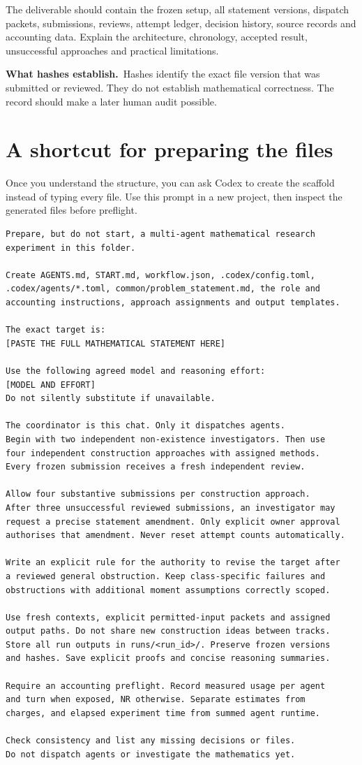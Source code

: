 \documentclass[11pt,a4paper]{article}
\newcommand{\note}[2]{\par\smallskip\noindent\colorbox{paperblue}{\parbox{\dimexpr\linewidth-2\fboxsep\relax}{\textbf{#1}\ #2}}\par\smallskip}
\begin{document}
The deliverable should contain the frozen setup, all statement versions, dispatch packets, submissions, reviews, attempt ledger, decision history, source records and accounting data. Explain the architecture, chronology, accepted result, unsuccessful approaches and practical limitations.

\note{What hashes establish.}{Hashes identify the exact file version that was submitted or reviewed. They do not establish mathematical correctness. The record should make a later human audit possible.}
\newpage

\section*{A shortcut for preparing the files}
Once you understand the structure, you can ask Codex to create the scaffold instead of typing every file. Use this prompt in a new project, then inspect the generated files before preflight.

\begin{lstlisting}
Prepare, but do not start, a multi-agent mathematical research
experiment in this folder.

Create AGENTS.md, START.md, workflow.json, .codex/config.toml,
.codex/agents/*.toml, common/problem_statement.md, the role and
accounting instructions, approach assignments and output templates.

The exact target is:
[PASTE THE FULL MATHEMATICAL STATEMENT HERE]

Use the following agreed model and reasoning effort:
[MODEL AND EFFORT]
Do not silently substitute if unavailable.

The coordinator is this chat. Only it dispatches agents.
Begin with two independent non-existence investigators. Then use
four independent construction approaches with assigned methods.
Every frozen submission receives a fresh independent review.

Allow four substantive submissions per construction approach.
After three unsuccessful reviewed submissions, an investigator may
request a precise statement amendment. Only explicit owner approval
authorises that amendment. Never reset attempt counts automatically.

Write an explicit rule for the authority to revise the target after
a reviewed general obstruction. Keep class-specific failures and
obstructions with additional moment assumptions correctly scoped.

Use fresh contexts, explicit permitted-input packets and assigned
output paths. Do not share new construction ideas between tracks.
Store all run outputs in runs/<run_id>/. Preserve frozen versions
and hashes. Save explicit proofs and concise reasoning summaries.

Require an accounting preflight. Record measured usage per agent
and turn when exposed, NR otherwise. Separate estimates from
charges, and elapsed experiment time from summed agent runtime.

Check consistency and list any missing decisions or files.
Do not dispatch agents or investigate the mathematics yet.
\end{lstlisting}
\end{document}
